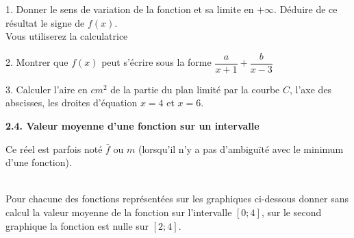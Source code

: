 \documentclass[11pt,a4paper]{article}
\newcommand{\cadre}[1]
{\begin{bclogo}[couleur = white,logo=,  arrondi = 0.3,barre=none]
		{%
			\rule{0mm}{#1mm}}\par
		\medskip
\end{bclogo}}
\begin{document}
	1. Donner le sens de variation de la fonction et sa limite en $+\infty$. Déduire de ce résultat le signe de $f(x)$. \\Vous utiliserez la calculatrice\\[2mm]
	\cadre{40}
	
	2. Montrer que $f(x)$ peut s'écrire sous la forme $\dfrac{a}{x+1} + \dfrac{b}{x-3}$ \\[2mm]
	\cadre{40}
	
	
	\newpage
	
	
	3. Calculer l'aire en $cm^2$ de la partie du plan limité par la courbe $C$, l'axe des abscisses, les droites d'équation $x=4$ et $x=6$. \\
	\cadre{50}
	
	\begin{mybox}
		\begin{center}
			\textbf{2.4. Valeur moyenne d'une fonction sur un intervalle}
		\end{center}
	\end{mybox}
	
	
	
	
	\cadre{40}
	
	Ce réel est parfois noté $\bar{f}$ ou $m$ (lorsqu'il n'y a pas d'ambiguïté avec le minimum d'une fonction). 
	
	\vspace{1cm}
	
	\\
	
	Pour chacune des fonctions représentées sur les graphiques ci-dessous donner sans calcul la valeur moyenne de la fonction sur l'intervalle $[0 ; 4]$, sur le second graphique la fonction est nulle sur $[2 ; 4]$.
	
\end{document}
